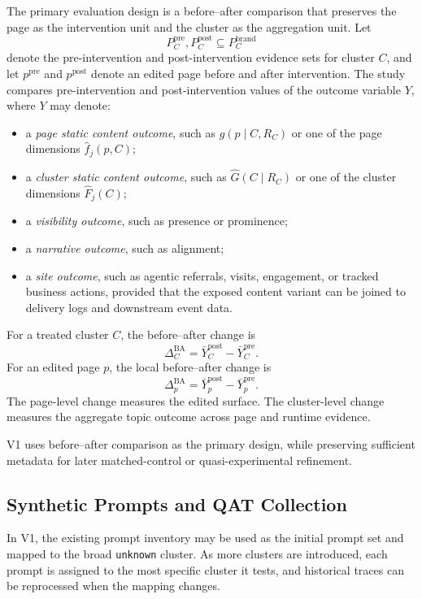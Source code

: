 \documentclass{article}
\begin{document}
The primary evaluation design is a before--after comparison that preserves the page as the intervention unit and the cluster as the aggregation unit. Let
\[
P_C^{\text{pre}}, P_C^{\text{post}} \subseteq P_C^{\text{brand}}
\]
denote the pre-intervention and post-intervention evidence sets for cluster \(C\), and let \(p^{\text{pre}}\) and \(p^{\text{post}}\) denote an edited page before and after intervention. The study compares pre-intervention and post-intervention values of the outcome variable \(Y\), where \(Y\) may denote:
\begin{itemize}
    \item a \emph{page static content outcome}, such as \(\hat{g}(p \mid C,R_C)\) or one of the page dimensions \(\hat{f}_j(p,C)\);
    \item a \emph{cluster static content outcome}, such as \(\hat{G}(C \mid R_C)\) or one of the cluster dimensions \(\hat{F}_j(C)\);
    \item a \emph{visibility outcome}, such as presence or prominence;
    \item a \emph{narrative outcome}, such as alignment;
    \item a \emph{site outcome}, such as agentic referrals, visits, engagement, or tracked business actions, provided that the exposed content variant can be joined to delivery logs and downstream event data.
\end{itemize}

For a treated cluster \(C\), the before--after change is
\[
\Delta^{\text{BA}}_C
=
\bar{Y}^{\text{post}}_C-\bar{Y}^{\text{pre}}_C.
\]
For an edited page \(p\), the local before--after change is
\[
\Delta^{\text{BA}}_p
=
\bar{Y}^{\text{post}}_p-\bar{Y}^{\text{pre}}_p.
\]
The page-level change measures the edited surface. The cluster-level change measures the aggregate topic outcome across page and runtime evidence.

V1 uses before--after comparison as the primary design, while preserving sufficient metadata for later matched-control or quasi-experimental refinement.

\subsection{Synthetic Prompts and QAT Collection}

In V1, the existing prompt inventory may be used as the initial prompt set and mapped to the broad \texttt{unknown} cluster. As more clusters are introduced, each prompt is assigned to the most specific cluster it tests, and historical traces can be reprocessed when the mapping changes.
\end{document}
